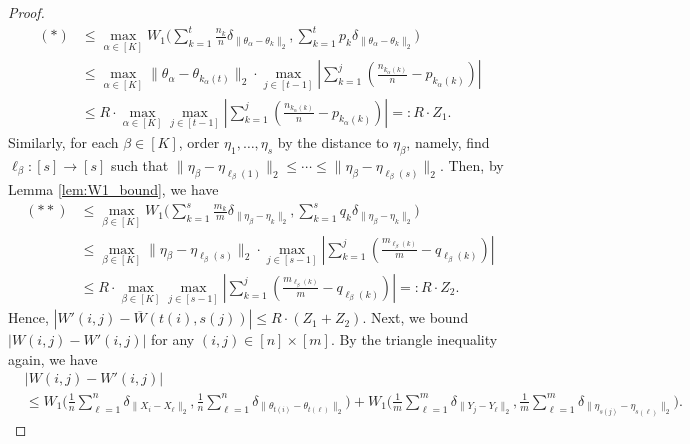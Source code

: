 \documentclass[11pt,letterpaper]{article}
\theoremstyle{definition}
\numberwithin{equation}{section}
\begin{document}
\begin{proof}
    \begin{equation*}
        \begin{split}
            (*)
            & \le \max_{\alpha \in [K]} W_1\bigg(\sum_{k = 1}^{t} \frac{n_k}{n} \delta_{\|\theta_\alpha - \theta_k\|_2}, \sum_{k = 1}^{t} p_k \delta_{\|\theta_\alpha - \theta_k\|_2}\bigg) \\
            & \le \max_{\alpha \in [K]} \|\theta_\alpha - \theta_{k_\alpha(t)}\|_2 \cdot \max_{j \in [t - 1]} \left|\sum_{k = 1}^{j} \left(\frac{n_{k_\alpha(k)}}{n} - p_{k_\alpha(k)}\right)\right| \\
            & \le R \cdot \max_{\alpha \in [K]} \max_{j \in [t - 1]} \left|\sum_{k = 1}^{j} \left(\frac{n_{k_\alpha(k)}}{n} - p_{k_\alpha(k)}\right)\right|
            =: R \cdot Z_1.
        \end{split}
    \end{equation*}
    Similarly, for each $\beta \in [K]$, order $\eta_1, \ldots, \eta_s$ by the distance to $\eta_\beta$, namely, find $\ell_\beta \colon [s] \to [s]$ such that $\|\eta_\beta - \eta_{\ell_\beta(1)}\|_2 \le \cdots \le \|\eta_\beta - \eta_{\ell_\beta(s)}\|_2$. Then, by Lemma \ref{lem:W1_bound}, we have
    \begin{equation*}
        \begin{split}
            (**)
            & \le \max_{\beta \in [K]} W_1\bigg(\sum_{k = 1}^{s} \frac{m_k}{m} \delta_{\|\eta_\beta - \eta_k\|_2}, \sum_{k = 1}^{s} q_k \delta_{\|\eta_\beta - \eta_k\|_2}\bigg) \\
            & \le \max_{\beta \in [K]} \|\eta_\beta - \eta_{\ell_\beta(s)}\|_2 \cdot \max_{j \in [s - 1]} \left|\sum_{k = 1}^{j} \left(\frac{m_{\ell_\beta(k)}}{m} - q_{\ell_\beta(k)}\right)\right| \\
            & \le R \cdot \max_{\beta \in [K]} \max_{j \in [s - 1]} \left|\sum_{k = 1}^{j} \left(\frac{m_{\ell_\beta(k)}}{m} - q_{\ell_\beta(k)}\right)\right|
            =: R \cdot Z_2.
        \end{split}
    \end{equation*}
    Hence, $|W'(i, j) - \overline{W}(t(i), s(j))| \le R \cdot (Z_1 + Z_2)$. Next, we bound $|W(i, j) - W'(i, j)|$ for any $(i, j) \in [n] \times [m]$. By the triangle inequality again, we have
    \begin{equation*}
        \begin{split}
            & |W(i, j) - W'(i, j)| \\
            & \le W_1\bigg(\frac{1}{n} \sum_{\ell = 1}^{n} \delta_{\|X_i - X_\ell\|_2}, \frac{1}{n} \sum_{\ell = 1}^{n} \delta_{\|\theta_{t(i)} - \theta_{t(\ell)}\|_2}\bigg) + W_1\bigg(\frac{1}{m} \sum_{\ell = 1}^{m} \delta_{\|Y_j - Y_\ell\|_2}, \frac{1}{m} \sum_{\ell = 1}^{m} \delta_{\|\eta_{s(j)} - \eta_{s(\ell)}\|_2}\bigg). 

\end{split}
\end{equation*}
\end{proof}
\end{document}
